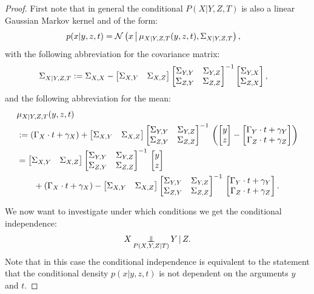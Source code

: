 \begin{proof}
First note that in general the conditional $P(X|Y,Z,T)$ is also a linear Gaussian Markov kernel and of the form:
\begin{align*}
p(x|y,z,t) &= \mathcal{N}\left ( x \,\middle|\, \mu_{X|Y,Z,T}(y,z,t), \Sigma_{X|Y,Z,T} \right ),
\end{align*}
with the following abbreviation for the covariance matrix:
\begin{align*}
    \Sigma_{X|Y,Z,T} & := \Sigma_{X,X} - \begin{bmatrix}\Sigma_{X,Y}&\Sigma_{X,Z}\end{bmatrix} \begin{bmatrix}\Sigma_{Y,Y}&\Sigma_{Y,Z}\\\Sigma_{Z,Y}&\Sigma_{Z,Z} \end{bmatrix}^{-1} \begin{bmatrix}\Sigma_{Y,X}\\\Sigma_{Z,X}\end{bmatrix},
\end{align*}
and the following abbreviation for the mean:
\begin{align*}
         &\mu_{X|Y,Z,T}(y,z,t) \\
         &:= \left ( \Gamma_X \cdot t + \gamma_X \right ) + \begin{bmatrix}\Sigma_{X,Y}&\Sigma_{X,Z}\end{bmatrix} \begin{bmatrix}\Sigma_{Y,Y}&\Sigma_{Y,Z}\\\Sigma_{Z,Y}&\Sigma_{Z,Z} \end{bmatrix}^{-1}\,\left (\begin{bmatrix}y\\z\end{bmatrix}-\begin{bmatrix}\Gamma_Y\cdot t + \gamma_Y\\\Gamma_Z \cdot t + \gamma_Z\end{bmatrix}\right )\\
                &= \begin{bmatrix}\Sigma_{X,Y}&\Sigma_{X,Z}\end{bmatrix} \begin{bmatrix}\Sigma_{Y,Y}&\Sigma_{Y,Z}\\\Sigma_{Z,Y}&\Sigma_{Z,Z} \end{bmatrix}^{-1}\,\begin{bmatrix}y\\z\end{bmatrix} \\
               &\qquad +  \left ( \Gamma_X \cdot t + \gamma_X \right ) - \begin{bmatrix}\Sigma_{X,Y}&\Sigma_{X,Z}\end{bmatrix} \begin{bmatrix}\Sigma_{Y,Y}&\Sigma_{Y,Z}\\\Sigma_{Z,Y}&\Sigma_{Z,Z} \end{bmatrix}^{-1}\,\begin{bmatrix}\Gamma_Y\cdot t + \gamma_Y\\\Gamma_Z \cdot t + \gamma_Z\end{bmatrix}.
    \end{align*}

We now want to investigate under which conditions we get the conditional independence:
\[ X \operatorname*{\perp\mkern-11mu\perp}_{P(X,Y,Z|T)} Y \operatorname*{|} Z.\]
Note that in this case the conditional independence is equivalent to the statement that the conditional density $p(x|y,z,t)$
is not dependent on the arguments $y$ and $t$.


\end{proof}
